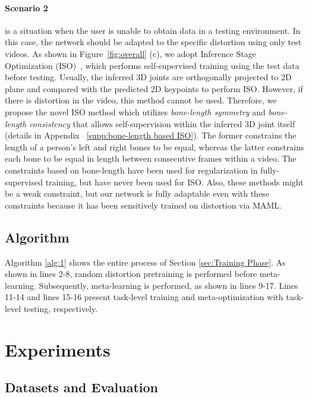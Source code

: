         \paragraph{Scenario 2} is a situation when the user is unable to obtain data in a testing environment. In this case, the network should be adapted to the specific distortion using only test videos. As shown in Figure~\ref{fig:overall} (c), we adopt Inference Stage Optimization (ISO)~\cite{ref18_ISO_NeurIPS2020}, which performs self-supervised training using the test data before testing. Usually, the inferred 3D joints are orthogonally projected to 2D plane and compared with the predicted 2D keypoints to perform ISO. However, if there is distortion in the video, this method cannot be used. Therefore, we propose the novel ISO method which utilizes \textit{bone-length symmetry} and \textit{bone-length consistency} that allows self-supervision within the inferred 3D joint itself (details in Appendix ~\ref{supp:bone-length based ISO}). The former constrains the length of a person's left and right bones to be equal, whereas the latter constrains each bone to be equal in length between consecutive frames within a video. The constraints based on bone-length have been used for regularization in fully-supervised training, but have never been used for ISO. Also, these methods might be a weak constraint, but our network is fully adaptable even with these constraints because it has been sensitively trained on distortion via MAML.
    
    \subsection{Algorithm}
        \vspace{-1mm}
        Algorithm \ref{alg:1} shows the entire process of Section \ref{sec:Training Phase}. As shown in lines 2-8, random distortion pretraining is performed before meta-learning. Subsequently, meta-learning is performed, as shown in lines 9-17. Lines 11-14 and lines 15-16 present task-level training and meta-optimization with task-level testing, respectively.
        \vspace{-1mm}


\section{Experiments}
\subsection{Datasets and Evaluation}
    \label{exp:datasets and evaluation}
